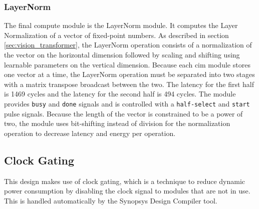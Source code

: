 \subsubsection{LayerNorm}
The final compute module is the LayerNorm module. It computes the Layer Normalization of a vector of fixed-point numbers. As described in section \ref{sec:vision_transformer}, the LayerNorm 
operation consists of a normalization of the vector on the horizontal dimension followed by scaling and shifting using learnable parameters on the vertical dimension. Because each \ac{cim} 
module stores one vector at a time, the LayerNorm operation must be separated into two stages with a matrix transpose broadcast between the two. The latency for the first half is 1469 cycles 
and the latency for the second half is 494 cycles. The module provides \texttt{busy} and \texttt{done} signals and is controlled with a \texttt{half-select} and \texttt{start} pulse signals.
Because the length of the vector is constrained to be a power of two, the module uses bit-shifting instead of division for the normalization operation to decrease latency and energy per operation.

\subsection{Clock Gating}
This design makes use of clock gating, which is a technique to reduce dynamic power consumption by disabling the clock signal to modules that are not in use. This is handled automatically by
the Synopsys Design Compiler tool.
